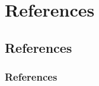 \section{References}

\subsection{References}

\begin{frame}[label=3]
\frametitle{References}

\begin{thebibliography}{99}
      
\end{thebibliography}
\end{frame}
